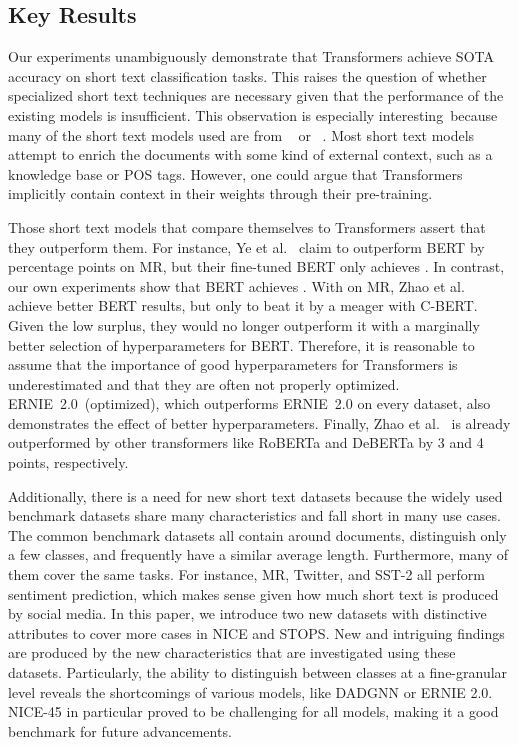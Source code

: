 \documentclass[runningheads]{llncs}
\begin{document}
\subsection{Key Results}
\label{sec:keyresults}

Our experiments unambiguously demonstrate that Transformers achieve \ac{SOTA} accuracy on short text classification tasks. This raises the question of whether specialized short text techniques are necessary given that the performance of the existing models is insufficient.
This observation is especially interesting because many of the short text models used are from ~\cite{hgat,zhao2021sequential,liu2021deep,wang2021short} or ~\cite{nc-hgat}.
Most short text models attempt to enrich the documents with some kind of external context, such as a knowledge base or \ac{POS} tags. However, one could argue that Transformers implicitly contain context in their weights through their pre-training.

Those short text models that compare themselves to Transformers assert that they outperform them.
For instance, Ye et al.~\cite{ye2020document} claim to outperform BERT by  percentage points on MR, but their fine-tuned BERT only achieves .
In contrast, our own experiments show that BERT achieves .
With  on MR, Zhao et al.~\cite{zhao2021sequential} achieve better BERT results, but only to beat it by a meager  with C-BERT. Given the low surplus, they would no longer outperform it with a marginally better selection of hyperparameters for BERT.
Therefore, it is reasonable to assume that the importance of good hyperparameters for Transformers is underestimated and that they are often not properly optimized.
ERNIE~2.0~(optimized), which outperforms ERNIE~2.0 on every dataset, also demonstrates the effect of better hyperparameters.
Finally, Zhao et al.~\cite{zhao2021sequential} is already outperformed by other transformers like RoBERTa and DeBERTa by 3 and 4 points, respectively.

Additionally, there is a need for new short text datasets because the widely used benchmark datasets share many characteristics and fall short in many use cases.
The common benchmark datasets all contain around  documents, distinguish only a few classes, and frequently have a similar average length. Furthermore, many of them cover the same tasks. For instance, MR, Twitter, and SST-2 all perform sentiment prediction, which makes sense given how much short text is produced by social media.
In this paper, we introduce two new datasets with distinctive attributes to cover more cases in NICE and STOPS. 
New and intriguing findings are produced by the new characteristics that are investigated using these datasets.
Particularly, the ability to distinguish between classes at a fine-granular level reveals the shortcomings of various models, like DADGNN or ERNIE 2.0.
NICE-45 in particular proved to be challenging for all models, making it a good benchmark for future advancements.
\end{document}
